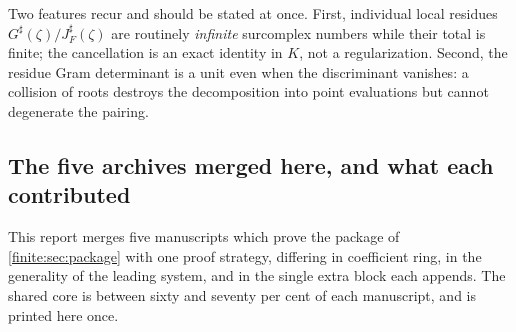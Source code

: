 \documentclass[11pt,letterpaper]{article}
\theoremstyle{definition}
\theoremstyle{remark}
\newcommand{\sh}{^{\sharp}}
\numberwithin{equation}{section}
\begin{document}
Two features recur and should be stated at once. First, individual local residues $G\sh(\zeta)/J_F\sh(\zeta)$ are routinely \emph{infinite} surcomplex numbers while their total is finite; the cancellation is an exact identity in $K$, not a regularization. Second, the residue Gram determinant is a unit even when the discriminant vanishes: a collision of roots destroys the decomposition into point evaluations but cannot degenerate the pairing.

\subsection{The five archives merged here, and what each contributed}
\label{finite:sec:provenance}

This report merges five manuscripts which prove the package of \cref{finite:sec:package} with one proof strategy, differing in coefficient ring, in the generality of the leading system, and in the single extra block each appends. The shared core is between sixty and seventy per cent of each manuscript, and is printed here once.
\end{document}
